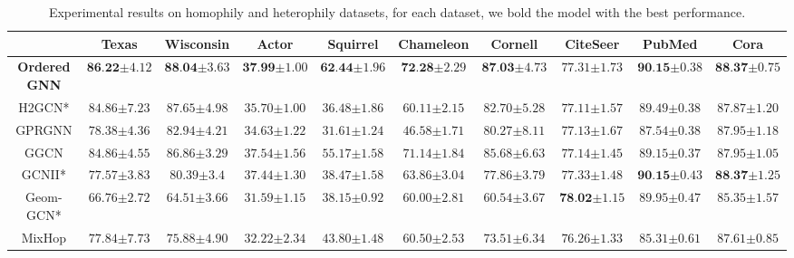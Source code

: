 \documentclass{article}
\begin{document}
\begin{table}\caption{Experimental results on homophily and heterophily datasets, for each dataset, we bold the model with the best performance.}
\label{table.results.hete_homo}
\centering
\resizebox{\textwidth}{!}
{
\begin{tabular}{c|cccccc|ccc}
\toprule
& Texas & Wisconsin & Actor & Squirrel & Chameleon & Cornell & CiteSeer & PubMed & Cora \\
\midrule
\textbf{Ordered GNN} & $\textbf{86.22}{\scriptstyle\pm4.12}$ & $\textbf{88.04}{\scriptstyle\pm3.63}$ & $\textbf{37.99}{\scriptstyle\pm1.00}$ & $\textbf{62.44}{\scriptstyle\pm1.96}$ & $\textbf{72.28}{\scriptstyle\pm2.29}$ & $\textbf{87.03}{\scriptstyle\pm4.73}$ & $77.31{\scriptstyle\pm1.73}$ & $\textbf{90.15}{\scriptstyle\pm0.38}$ & $\textbf{88.37}{\scriptstyle\pm0.75}$ \\
\midrule
H2GCN* & $84.86{\scriptstyle\pm7.23}$ & $87.65{\scriptstyle\pm4.98}$ & $35.70{\scriptstyle\pm1.00}$ & $36.48{\scriptstyle\pm1.86}$ & $60.11{\scriptstyle\pm2.15}$ & $82.70{\scriptstyle\pm5.28}$ &  $77.11{\scriptstyle\pm1.57}$ & $89.49{\scriptstyle\pm0.38}$ & $87.87{\scriptstyle\pm1.20}$ \\
GPRGNN & $78.38{\scriptstyle\pm4.36}$ & $82.94{\scriptstyle\pm4.21}$ & $34.63{\scriptstyle\pm1.22}$ & $31.61{\scriptstyle\pm1.24}$ & $46.58{\scriptstyle\pm1.71}$ & $80.27{\scriptstyle\pm8.11}$ &  $77.13{\scriptstyle\pm1.67}$ & $87.54{\scriptstyle\pm0.38}$ & $87.95{\scriptstyle\pm1.18}$ \\
GGCN & $84.86{\scriptstyle\pm4.55}$ & $86.86{\scriptstyle\pm3.29}$ &
$37.54{\scriptstyle\pm1.56}$ & $55.17{\scriptstyle\pm1.58}$ & $71.14{\scriptstyle\pm1.84}$ & $85.68{\scriptstyle\pm6.63}$ &  $77.14{\scriptstyle\pm1.45}$ & $89.15{\scriptstyle\pm0.37}$ & $87.95{\scriptstyle\pm1.05}$ \\
\midrule
GCNII* & $77.57{\scriptstyle\pm3.83}$ & $80.39{\scriptstyle\pm3.4}$ & $37.44{\scriptstyle\pm1.30}$ & $38.47{\scriptstyle\pm1.58}$ & $63.86{\scriptstyle\pm3.04}$ & $77.86{\scriptstyle\pm3.79}$ & $77.33{\scriptstyle\pm1.48}$ &
$\textbf{90.15}{\scriptstyle\pm0.43}$ &
$\textbf{88.37}{\scriptstyle\pm1.25}$ \\
Geom-GCN* & $66.76{\scriptstyle\pm2.72}$ & $64.51{\scriptstyle\pm3.66}$ & $31.59{\scriptstyle\pm1.15}$ & $38.15{\scriptstyle\pm0.92}$ & $60.00{\scriptstyle\pm2.81}$ & $60.54{\scriptstyle\pm3.67}$ &  $\textbf{78.02}{\scriptstyle\pm1.15}$ & $89.95{\scriptstyle\pm0.47}$ & $85.35{\scriptstyle\pm1.57}$ \\
\midrule
MixHop & $77.84{\scriptstyle\pm7.73}$ & $75.88{\scriptstyle\pm4.90}$ & $32.22{\scriptstyle\pm2.34}$ & $43.80{\scriptstyle\pm1.48}$ & $60.50{\scriptstyle\pm2.53}$ & $73.51{\scriptstyle\pm6.34}$ & $76.26{\scriptstyle\pm1.33}$ & $85.31{\scriptstyle\pm0.61}$ & $87.61{\scriptstyle\pm0.85}$ \\ 

\end{tabular}}
\end{table}
\end{document}
